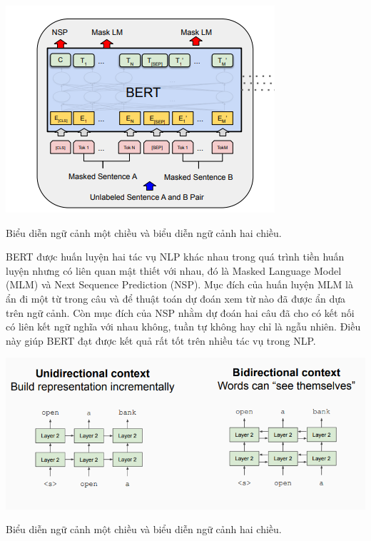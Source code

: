 \documentclass[a4paper, 12pt, openany]{book}
\begin{document}
\begin{minipage}{\linewidth}
    \captionsetup{type=figure}
    \centering
    \includegraphics[width=.8\linewidth]{./assets/images/BERT-pretraining.png}
    \caption{Biểu diễn ngữ cảnh một chiều và biểu diễn ngữ cảnh hai chiều.}
\end{minipage}
\vspace{0.5cm}

BERT được huấn luyện hai tác vụ NLP khác nhau trong quá trình tiền huấn luyện  nhưng có liên quan mật thiết với nhau, đó là
Masked Language Model (MLM) và Next Sequence Prediction (NSP). Mục đích của huấn luyện MLM là ẩn đi một từ trong câu và để thuật toán dự đoán xem từ nào đã được ẩn
dựa trên ngữ cảnh. Còn mục đích của NSP nhằm dự đoán hai câu đã cho có kết nối có liên kết ngữ nghĩa
với nhau không, tuần tự không hay chỉ là ngẫu nhiên. Điều này giúp BERT đạt được kết
quả rất tốt trên nhiều tác vụ trong NLP.

\begin{minipage}{\linewidth}
    \captionsetup{type=figure}
    \centering
    \includegraphics[width=\linewidth]{./assets/images/BERT-bidirectional.png}
    \caption{Biểu diễn ngữ cảnh một chiều và biểu diễn ngữ cảnh hai chiều.}
\end{minipage}
\vspace{0.5cm}
\end{document}
